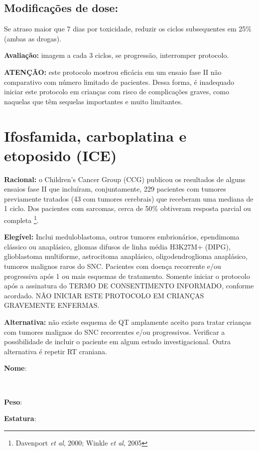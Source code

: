 \documentclass[11pt,a4paper,oldfontcommands]{memoir}
\def\entrywithlabel[#1]#2{\parbox{#1}{{\small #2:} \hrulefill}}
\begin{document}
\subsection{Modificações de dose:}
Se atraso maior que 7 dias por toxicidade, reduzir os ciclos subsequentes em 25\% (ambas as drogas).

\textbf{Avaliação:} imagem a cada 3 ciclos, se progressão, interromper protocolo.

\textbf{ATENÇÃO:} este protocolo mostrou eficácia em um ensaio fase II não comparativo com número limitado de pacientes. Dessa forma, é inadequado iniciar este protocolo em crianças com risco de complicações graves, como naquelas que têm sequelas importantes e muito limitantes.
\cleardoublepage

\section{Ifosfamida, carboplatina e etoposido (ICE)}
{\let\thefootnote\relax{}}
\textbf{Racional:} o Children's Cancer Group (CCG) publicou os resultados de alguns ensaios fase II que incluíram, conjuntamente, 229 pacientes com tumores previamente tratados (43 com tumores cerebrais) que receberam uma mediana de 1 ciclo. Dos pacientes com sarcomas, cerca de 50\% obtiveram resposta parcial ou completa \footnote{Davenport \textit{et al}, 2000; Winkle \textit{et al}, 2005}.

\textbf{Elegível:} Inclui meduloblastoma, outros tumores embrionários, ependimoma clássico ou anaplásico, gliomas difusos de linha média H3K27M+ (DIPG), glioblastoma multiforme, astrocitoma anaplásico, oligodendroglioma anaplásico, tumores malignos raros do SNC. Pacientes com doença recorrente e/ou progressiva após 1 ou mais esquemas de tratamento. Somente iniciar o protocolo após a assinatura do TERMO DE CONSENTIMENTO INFORMADO, conforme acordado. NÃO INICIAR ESTE PROTOCOLO EM CRIANÇAS GRAVEMENTE ENFERMAS.

\textbf{Alternativa:} não existe esquema de QT amplamente aceito para tratar crianças com tumores malignos do SNC recorrentes e/ou progressivos. Verificar a possibilidade de incluir o paciente em algum estudo investigacional. Outra alternativa é repetir RT craniana.
\\[0.4cm]
\entrywithlabel[1\hsize]{\textbf{Nome}}\hfill
\\[0.3cm]
\entrywithlabel[.45\hsize]{\textbf{Peso}}\hfill  \entrywithlabel[.45\hsize]{\textbf{Estatura}}
\end{document}
